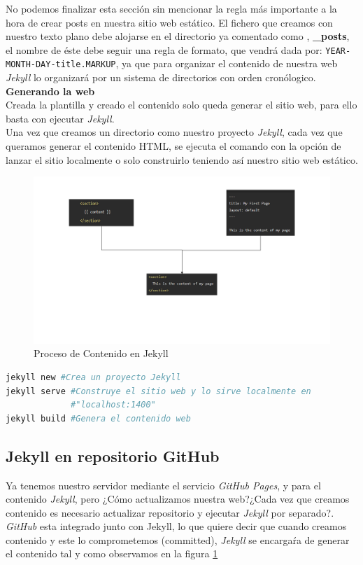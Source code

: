 No podemos finalizar esta sección sin mencionar la regla más importante a la hora de crear posts en nuestra sitio web estático. El fichero que creamos con nuestro texto plano debe alojarse en el directorio ya comentado como , \textbf{\_posts}, el nombre de éste debe seguir una regla de formato, que vendrá dada por: \texttt{YEAR-MONTH-DAY-title.MARKUP}, ya que para organizar el contenido de nuestra web \emph{Jekyll} lo organizará por un sistema de directorios con orden cronólogico.  \\
\textbf{\large{Generando la web}}\\
Creada la plantilla y creado el contenido solo queda generar el sitio web, para ello basta con ejecutar \emph{Jekyll}.\\
Una vez que creamos un directorio como nuestro proyecto \emph{Jekyll}, cada vez que queramos generar el contenido HTML, se ejecuta el comando con la opción de lanzar el sitio localmente o solo construirlo teniendo así nuestro sitio web estático.
\begin{figure}[h]
    \centering
    \includegraphics[width=\textwidth]{img/jekyll_process2.png}
    \caption{Proceso de Contenido en Jekyll}
    \label{fig:jekyllProc2}
\end{figure}
\begin{lstlisting}[language=sh,caption={Comandos para crear un sitio web}]
jekyll new #Crea un proyecto Jekyll
jekyll serve #Construye el sitio web y lo sirve localmente en
             #"localhost:1400"
jekyll build #Genera el contenido web
\end{lstlisting}
\subsection*{Jekyll en repositorio GitHub}
\label{subsec:jekandGit}
Ya tenemos nuestro servidor mediante el servicio \emph{GitHub Pages}, y para el contenido \emph{Jekyll}, pero ¿Cómo actualizamos nuestra web?¿Cada vez que creamos contenido es necesario actualizar repositorio y ejecutar \emph{Jekyll} por separado?. \\
\emph{GitHub} esta integrado junto con Jekyll, lo que quiere decir que cuando creamos contenido y este lo comprometemos (committed), \emph{Jekyll} se encargaŕa de generar el contenido tal y como observamos en la figura \ref{fig:jekyllProc2}
